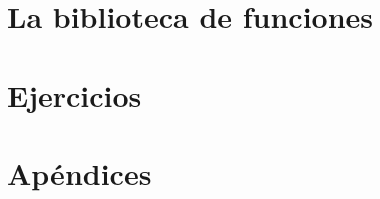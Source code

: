 \documentclass[10pt,fleqn,a4]{book}
\begin{document}




\part{La biblioteca de funciones}









\part{Ejercicios}




\appendix

\part{Apéndices}





\end{document}
